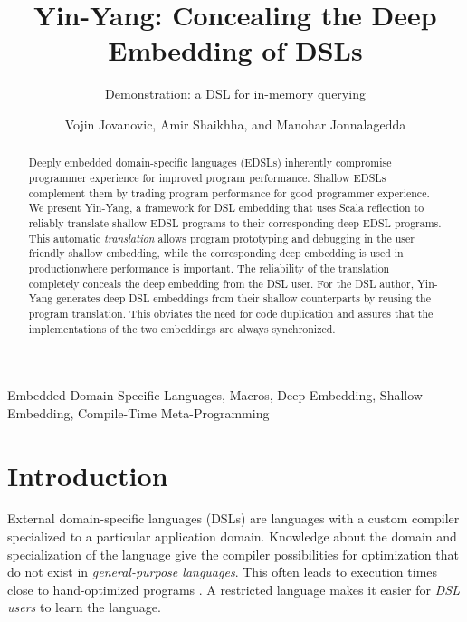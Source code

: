 \documentclass{llncs}
\begin{document}
\title{Yin-Yang: Concealing the Deep Embedding of DSLs}
\subtitle{Demonstration: a DSL for in-memory querying}

\author{Vojin Jovanovic, Amir Shaikhha, and Manohar Jonnalagedda}


\maketitle

\begin{abstract}
Deeply embedded domain-specific languages (EDSLs) inherently compromise programmer experience for improved program performance. Shallow EDSLs complement them by trading program performance for good programmer experience. We present Yin-Yang, a framework for DSL embedding that uses Scala reflection to reliably translate shallow EDSL programs to their corresponding deep EDSL programs. This automatic \emph{translation} allows program prototyping and debugging in the user friendly shallow embedding, while the corresponding deep embedding is used in production\textemdash where performance is important. The reliability of the translation completely conceals the deep embedding from the DSL user. For the DSL author, Yin-Yang generates deep DSL embeddings from their shallow counterparts by reusing the program translation. This obviates the need for code duplication and assures that the implementations of the two embeddings are always synchronized.
\end{abstract}

\keywords
Embedded Domain-Specific Languages, Macros, Deep Embedding, Shallow Embedding, Compile-Time Meta-Programming

\section{Introduction}

External domain-specific languages (DSLs) are languages with a custom compiler specialized to a particular application domain. Knowledge about the domain and specialization of the language give the compiler possibilities for optimization that do not exist in \emph{general-purpose languages}. This often leads to execution times close to hand-optimized programs \cite{rompf_optimizing_2013}. A restricted language makes it easier for \emph{DSL users} to learn the language.
\end{document}

